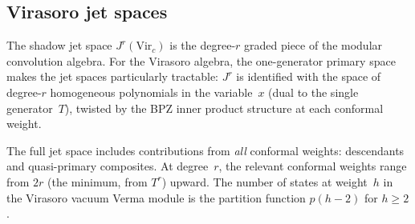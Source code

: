 
\subsection{Virasoro jet spaces}
\label{subsec:virasoro-jet-spaces}

The shadow jet space $J^r(\mathrm{Vir}_c)$ is the
degree-$r$ graded piece of the modular convolution algebra.
For the Virasoro algebra, the one-generator primary space
makes the jet spaces particularly tractable: $J^r$ is
identified with the space of degree-$r$ homogeneous
polynomials in the variable~$x$ (dual to the single
generator~$T$), twisted by the BPZ inner product
structure at each conformal weight.

The full jet space includes contributions from
\emph{all} conformal weights: descendants and
quasi-primary composites. At degree~$r$, the relevant
conformal weights range from $2r$ (the minimum, from
$T^r$) upward. The number of states at weight~$h$
in the Virasoro vacuum Verma module is the
partition function $p(h - 2)$ for $h \geq 2$.

